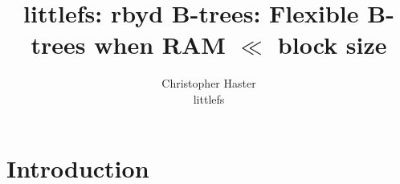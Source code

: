 \documentclass[letterpaper,twocolumn,10pt]{article}
\def\lfs+{littlefs}
\begin{document}

\date{}

\title{\Large \bf
    \lfs+: rbyd B-trees: Flexible B-trees when RAM $\ll$ block size
}

\ifdefined\yesanon\else
\author{
{\rm Christopher Haster}\\
\lfs+
} %
\fi

\maketitle



\section{Introduction}
\label{sec:introduction}
\end{document}
